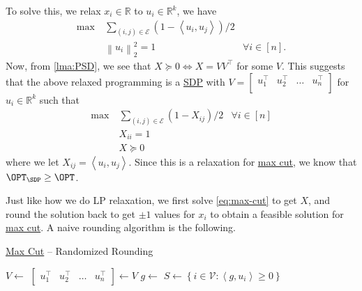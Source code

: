 To solve this, we relax \(x_i\in \mathbb{R} \) to \(u_i\in \mathbb{R} ^k\), we have
\[
	\begin{aligned}
		\max~ & \sum_{(i, j)\in \mathcal{E}} ( 1 - \left\langle u_i, u_j \right\rangle ) / 2                     \\
		      & \left\lVert u_i\right\rVert _2 ^{2} = 1                                      & \forall i\in [n].
	\end{aligned}
\]
Now, from \autoref{lma:PSD}, we see that \(X \succeq 0 \iff X = V V^{\top} \) for some \(V\). This suggests that the above relaxed programming is a \hyperref[def:SDP]{SDP} with \(V = \begin{bmatrix}
	u_1 ^{\top} & u_2 ^{\top} & \dots & u_n ^{\top} \\
\end{bmatrix}\) for \(u_i \in \mathbb{R} ^k\) such that
\begin{equation}\label{eq:max-cut}
	\begin{aligned}
		\max~ & \sum_{(i, j)\in \mathcal{E}} ( 1 - X_{ij} ) / 2 & \forall i\in [n] \\
		      & X_{ii} = 1                                                         \\
		      & X \succeq 0
	\end{aligned}
\end{equation}
where we let \(X_{ij} = \left\langle u_i, u_j \right\rangle \). Since this is a relaxation for \hyperref[prb:max-cut]{max cut}, we know that \(\OPT_{\SDP } \geq \OPT\).

Just like how we do LP relaxation, we first solve \autoref{eq:max-cut} to get \(X\), and round the solution back to get \(\pm 1\) values for \(x_i\) to obtain a feasible solution for \hyperref[prb:max-cut]{max cut}. A naive rounding algorithm is the following.

\begin{algorithm}[H]\label{algo:max-cut-randomized-rounding}
	\DontPrintSemicolon
	\caption{\hyperref[prb:max-cut]{Max Cut} -- Randomized Rounding}
	\BlankLine
	\(V\gets\)
	\(\begin{bmatrix}u_1 ^{\top} & u_2 ^{\top} & \dots & u_n ^{\top}\end{bmatrix}\gets V\)\;
	\(g\gets\)
	\(S\gets \left\{ i\in \mathcal{V} \colon \left\langle g, u_i \right\rangle \geq 0 \right\} \)
	\;
\end{algorithm}

